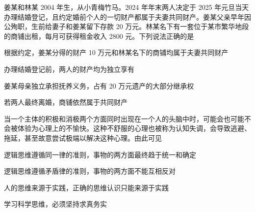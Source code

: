 \documentclass{exam-zh}
\begin{document}
\begin{question}
  姜某和林某 2004 年生，从小青梅竹马。2024 年年末两人决定于 2025 年元旦当天办理结婚登记，且约定婚前个人的一切财产都属于夫妻共同财产。姜某父亲早年因公殉职，生前给妻子和姜某留下存款 20 万元。林某名下有一套位于某市繁华地段的商铺出租，每月可获得租金收入 2800 元。下列说法正确的是

   根据约定，姜某分得的财产 10 万元和林某名下的商铺均属于夫妻共同财产

   办理结婚登记前，两人的财产均为独立享有

   姜某母亲独立承担抚养义务，占有 20 万元遗产的大部分继承权

   若两人最终离婚，商铺依然属于共同财产

  \begin{choices}
  \item {}
  \item {}
  \item {}
  \item {}
  \end{choices}
\end{question}

\begin{question}
  当一个主体的积极和消极两个方面同时出现在一个人的头脑中时，可能会也可能不会被体验为心理上的不愉快。这种不舒服的心理也被称为认知失调，会导致逃避、拖延，甚至故意尝试极端以解决这种心理。由此可见

   逻辑思维遵循同一律的准则，事物的两方面最终趋于统一和确定

   逻辑思维遵循矛盾律的准则，事物的两方面不能互相反对

   人的思维来源于实践，正确的思维认识只能来源于实践

   学习科学思维，必须坚持求真务实

  \begin{choices}
  \item {}
  \item {}
  \item {}
  \item {}
  \end{choices}
\end{question}
\end{document}
